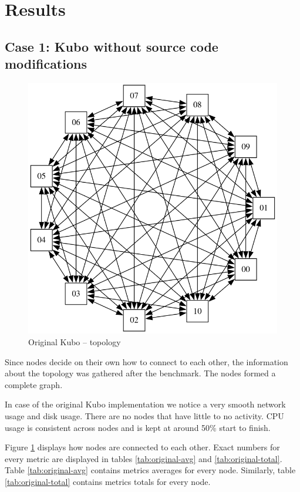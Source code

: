 \newpage
\section{Results}

\subsection{Case 1: Kubo without source code modifications}

\begin{figure}
\centering
\captionsetup{justification=centering,width=0.6\linewidth}
\includegraphics[width=0.8\linewidth]{figures/topologies/original.png}
\caption{Original Kubo -- topology}
\label{fig:original-topology}
\end{figure}

Since nodes decide on their own how to connect to each other, the
information about the topology was gathered after the benchmark. The nodes
formed a complete graph.

In case of the original Kubo implementation we notice a very smooth network
usage and disk usage. There are no nodes that have little to no activity. CPU
usage is consistent across nodes and is kept at around 50\% start to finish.

Figure \ref{fig:original-topology} displays how nodes are connected to each
other. Exact numbers for every metric are displayed in tables
\ref{tab:original-avg} and \ref{tab:original-total}. Table
\ref{tab:original-avg} contains metrics averages for every node. Similarly,
table \ref{tab:original-total} contains metrics totals for every node.


